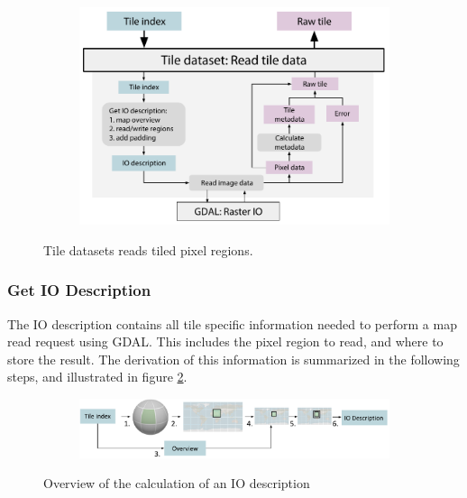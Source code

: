 \begin{figure}[htbp]
    \centering
    \begin{subfigure}[bt]{0.8\textwidth}
        \includegraphics[width=\textwidth]{figures/implementation/pipeline/tiledataset.pdf}
    \end{subfigure}
    \caption{Tile datasets reads tiled pixel regions.}
    \label{fig:tiledataset}
\end{figure}

\subsubsection{Get IO Description}
The IO description contains all tile specific information needed to perform a map read request using GDAL. This includes the pixel region to read, and where to store the result. The derivation of this information is summarized in the following steps, and illustrated in figure \ref{fig:getiodescription}.

\begin{figure}[htbp]
    \centering
    \begin{subfigure}[bt]{0.9\textwidth}
        \includegraphics[width=\textwidth]{figures/implementation/pipeline/getiodescription.pdf}
    \end{subfigure}
    \caption{Overview of the calculation of an IO description}
    \label{fig:getiodescription}
\end{figure}


